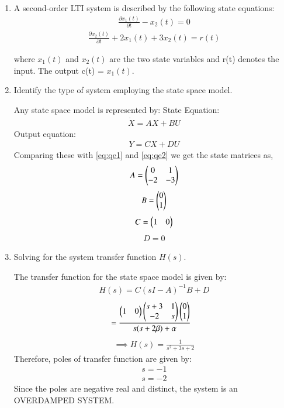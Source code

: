 \begin{enumerate}[label=\thesubsection.\arabic*.,ref=\thesubsection.\theenumi]

\item A second-order LTI system is described by the following state equations:
\begin{align}
\label{eq:qe1}
\frac{\partial x_1(t)}{\partial t} - x_2(t) = 0
\end{align}
\begin{align}
\label{eq:qe2}
\frac{\partial x_2(t)}{\partial t} + 2x_1(t) + 3x_2(t) = r(t)
\end{align}

where $x_1(t)$ and $x_2(t)$ are the two state variables and r(t) denotes the input. The output c(t) = $x_1(t)$.

\item Identify the type of system employing the state space model. 

\solution Any state space model is represented by:
\newline State Equation:
\begin{align}
\dot{X} = AX + BU
\end{align}
\newline Output equation:
\begin{align}
Y = CX + DU
\end{align}
Comparing these with \eqref{eq:qe1} and \eqref{eq:qe2} we get the state matrices as,
\begin{align}
    A = \begin{pmatrix}0&1\\-2&-3\end{pmatrix}
\end{align}
\begin{align}
    B = \begin{pmatrix}0\\1\end{pmatrix}
\end{align}
\begin{align}
    C = \begin{pmatrix}1&0\end{pmatrix}
\end{align}
\begin{align}
    D = 0
\end{align}

\item Solving for the system transfer function $H(s)$.

\solution The transfer function for the state space model is given by:
\begin{align}
H(s) = C(sI - A)^{-1}B + D
\end{align}
\begin{align}
& = \frac
{
\begin{pmatrix}1&0\end{pmatrix}\begin{pmatrix}s+3&1\\-2&s\end{pmatrix}\begin{pmatrix}0\\1\end{pmatrix}
}
{
s(s+2\beta) + \alpha
}
\end{align}
\begin{align}
\implies H(s) = \frac{1}{s^{2}+3s+2}
\end{align}
Therefore, poles of transfer function are given by:
\begin{align}
s = -1
\end{align}
\begin{align}
s = -2
\end{align}
Since the poles are negative real and distinct, the system is an OVERDAMPED SYSTEM.


\end{enumerate}
